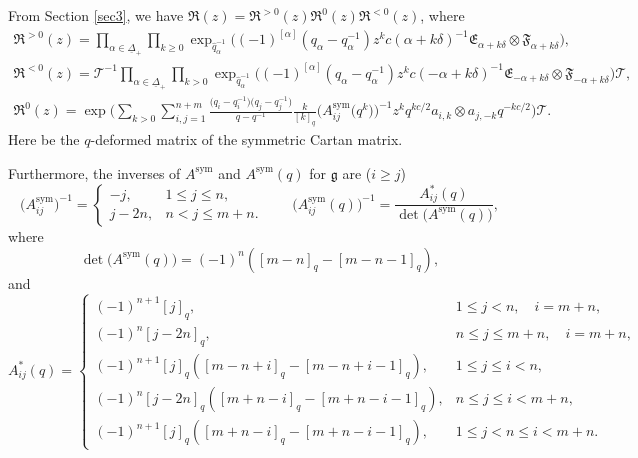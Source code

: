 \documentclass[pdftex]{sigma}
\numberwithin{equation}{section}
\begin{document}
From Section \ref{sec3}, we have
$\mathfrak{R}(z)=\mathfrak{R}^{>0}(z)\mathfrak{R}^{0}(z)\mathfrak{R}^{<0}(z)$,
where
\begin{gather*}
 \mathfrak{R}^{>0}(z)=\prod\limits_{\alpha\in\underline{\Delta}_{+} }\prod\limits_{k\geq0 }\exp_{\hat{q}_{\alpha}^{-1}}\bigl((-1)^{[\alpha]}(q_{\alpha}-q_{\alpha}^{-1})z^kc(\alpha+k\delta)^{-1}\mathfrak{E}_{\alpha+k\delta}\otimes \mathfrak{F}_{\alpha+k\delta}\bigr), \\
 \mathfrak{R}^{<0}(z)=\mathcal{T}^{-1}\prod\limits_{\alpha\in\underline{\Delta}_{+} }\prod\limits_{k>0 }\exp_{\hat{q}_{\alpha}^{-1}}\bigl((-1)^{[\alpha]}(q_{\alpha}-q_{\alpha}^{-1})z^kc(-\alpha+k\delta)^{-1}\mathfrak{E}_{-\alpha+k\delta}\otimes \mathfrak{F}_{-\alpha+k\delta}\bigr)\mathcal{T},
\\
 \mathfrak{R}^{0}(z)=\exp\Biggl(\sum\limits_{k>0}\sum\limits_{i,j=1}^{n+m}\frac{\bigl(q_i-q_i^{-1}\bigr)\bigl(q_j-q_j^{-1}\bigr)}{q-q^{-1}}
 \frac{k}{[k]_q}\bigl(A_{ij}^{\operatorname{sym}}\bigl(q^k\bigr)\bigr)^{-1}
 z^kq^{kc/2}
 a_{i,k}\otimes a_{j,-k}q^{-kc/2}\Biggr)\mathcal{T}.
\end{gather*}
Here  be the $q$-deformed matrix of the symmetric Cartan matrix.

Furthermore, the inverses of $A^{\operatorname{sym}}$ and $A^{\operatorname{sym}}(q)$ for $\mathfrak{g}$ are ($i\geq j$)
\begin{equation*}
 \bigl(A_{ij}^{\operatorname{sym}}\bigr)^{-1}=
 \begin{cases}
 -j,& 1\leq j\leq n,\\
 j-2n,& n< j\leq m+n.
 \end{cases}\qquad \bigl(A_{ij}^{\operatorname{sym}}(q)\bigr)^{-1}=\frac{A_{ij}^*(q)}{\operatorname{det}\bigl(A^{\operatorname{sym}}(q)\bigr)},
\end{equation*}
where
\begin{equation*}
 \operatorname{det}\bigl(A^{\operatorname{sym}}(q)\bigr)=(-1)^n([m-n]_q-[m-n-1]_q),
\end{equation*}
and
\begin{equation*}
 A_{ij}^*(q)=
 \begin{cases}
 (-1)^{n+1}[j]_q, & 1\leq j<n,\quad i=m+n,\\
 (-1)^n[j-2n]_q, & n\leq j\leq m+n,\quad i=m+n,\\
 (-1)^{n+1}[j]_q([m-n+i]_q-[m-n+i-1]_q), & 1\leq j\leq i<n,\\
 (-1)^n[j-2n]_q([m+n-i]_q-[m+n-i-1]_q), & n\leq j\leq i< m+n,\\
 (-1)^{n+1}[j]_q([m+n-i]_q-[m+n-i-1]_q), & 1\leq j<n\leq i< m+n.
 \end{cases}
\end{equation*}
\end{document}

